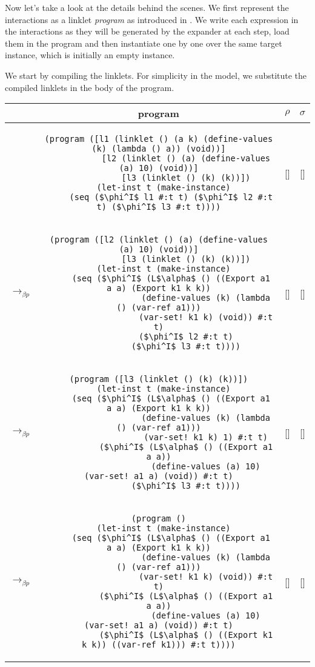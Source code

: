 Now let's take a look at the details behind the scenes. We first
represent the interactions as a linklet \emph{program} as introduced
in . We write each expression in the
interactions as they will be generated by the expander at each step,
load them in the program and then instantiate one by one over the same
target instance, which is initially an empty instance.

We start by compiling the linklets. For simplicity in the model, we
substitute the compiled linklets in the body of the program.

\begin{table}[h!]
  \centering
  \footnotesize
  \begin{tabular}{lc|c|c}
    &\textbf{program} & \textbf{$\rho$} & \textbf{$\sigma$} \\ \hline \hline
    &\begin{lstlisting}[mathescape]
(program ([l1 (linklet () (a k) (define-values (k) (lambda () a)) (void))]
           [l2 (linklet () (a) (define-values (a) 10) (void))]
           [l3 (linklet () (k) (k))])
  (let-inst t (make-instance)
     (seq ($\phi^I$ l1 #:t t) ($\phi^I$ l2 #:t t) ($\phi^I$ l3 #:t t))))
    \end{lstlisting} & [] & [] \\ \hline
    $\longrightarrow_{\beta p}$&\begin{lstlisting}[mathescape]
(program ([l2 (linklet () (a) (define-values (a) 10) (void))]
           [l3 (linklet () (k) (k))])
  (let-inst t (make-instance)
     (seq ($\phi^I$ (L$\alpha$ () ((Export a1 a a) (Export k1 k k))
                   (define-values (k) (lambda () (var-ref a1)))
                   (var-set! k1 k) (void)) #:t t)
           ($\phi^I$ l2 #:t t)
           ($\phi^I$ l3 #:t t))))
    \end{lstlisting} & [] & [] \\ \hline
    $\longrightarrow_{\beta p}$&\begin{lstlisting}[mathescape]
(program ([l3 (linklet () (k) (k))])
  (let-inst t (make-instance)
     (seq ($\phi^I$ (L$\alpha$ () ((Export a1 a a) (Export k1 k k))
                   (define-values (k) (lambda () (var-ref a1)))
                   (var-set! k1 k) 1) #:t t)
           ($\phi^I$ (L$\alpha$ () ((Export a1 a a))
                   (define-values (a) 10) (var-set! a1 a) (void)) #:t t)
           ($\phi^I$ l3 #:t t))))
    \end{lstlisting} & [] & [] \\ \hline
    $\longrightarrow_{\beta p}$&\begin{lstlisting}[mathescape]
(program ()
  (let-inst t (make-instance)
     (seq ($\phi^I$ (L$\alpha$ () ((Export a1 a a) (Export k1 k k))
                   (define-values (k) (lambda () (var-ref a1)))
                   (var-set! k1 k) (void)) #:t t)
           ($\phi^I$ (L$\alpha$ () ((Export a1 a a))
                   (define-values (a) 10) (var-set! a1 a) (void)) #:t t)
           ($\phi^I$ (L$\alpha$ () ((Export k1 k k)) ((var-ref k1))) #:t t))))
    \end{lstlisting} & [] & [] \\ \hline
  \end{tabular}
\end{table}

